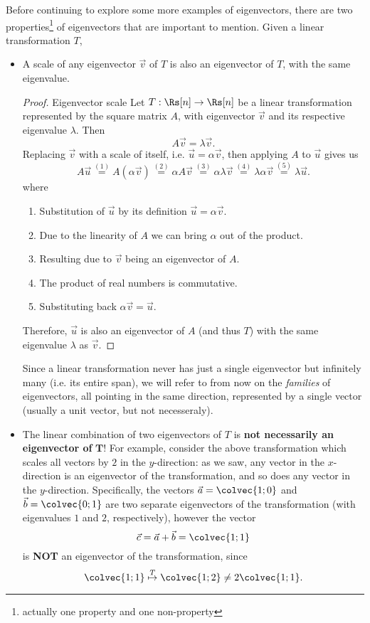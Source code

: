 Before continuing to explore some more examples of eigenvectors, there are two properties\footnote{actually one property and one non-property} of eigenvectors that are important to mention. Given a linear transformation $T$,
\begin{itemize}
	\item A scale of any eigenvector $\vec{v}$ of $T$ is also an eigenvector of $T$, with the same eigenvalue.
		\begin{proof}{Eigenvector scale}{}
			Let $T:\Rs[n]\to\Rs[n]$ be a linear transformation represented by the square matrix $A$, with eigenvector $\vec{v}$ and its respective eigenvalue $\lambda$. Then
			\[
				A\vec{v} = \lambda\vec{v}.
			\]
			Replacing $\vec{v}$ with a scale of itself, i.e. $\vec{u}=\alpha\vec{v}$, then applying $A$ to $\vec{u}$ gives us
			\[
				A\vec{u} \overset{(1)}{=} A \left( \alpha\vec{v} \right) \overset{(2)}{=} \alpha A \vec{v} \overset{(3)}{=} \alpha\lambda\vec{v} \overset{(4)}{=} \lambda\alpha\vec{v} \overset{(5)}{=} \lambda\vec{u}.
			\]
			where
			\begin{enumerate}[label=(\arabic*)]
				\item Substitution of $\vec{u}$ by its definition $\vec{u}=\alpha\vec{v}$.
				\item Due to the linearity of $A$ we can bring $\alpha$ out of the product.
				\item Resulting due to $\vec{v}$ being an eigenvector of $A$.
				\item The product of real numbers is commutative.
				\item Substituting back $\alpha\vec{v}=\vec{u}$.
			\end{enumerate}

			Therefore, $\vec{u}$ is also an eigenvector of $A$ (and thus $T$) with the same eigenvalue $\lambda$ as $\vec{v}$.
		\end{proof}

		Since a linear transformation never has just a single eigenvector but infinitely many (i.e. its entire span), we will refer to from now on the \emph{families} of eigenvectors, all pointing in the same direction, represented by a single vector (usually a unit vector, but not necesseraly).

	\item The linear combination of two eigenvectors of $T$ is \textbf{not necessarily an eigenvector of} $\bm{T}$! For example, consider the above transformation which scales all vectors by $2$ in the $y$-direction: as we saw, any vector in the $x$-direction is an eigenvector of the transformation, and so does any vector in the $y$-direction. Specifically, the vectors $\vec{a}=\colvec{1;0}$ and $\vec{b}=\colvec{0;1}$ are two separate eigenvectors of the transformation (with eigenvalues $1$ and $2$, respectively), however the vector
		\[
			\vec{c} = \vec{a}+\vec{b} = \colvec{1;1}
		\]
		is \textbf{NOT} an eigenvector of the transformation, since
		\[
			\colvec{1;1} \overset{T}{\mapsto} \colvec{1;2} \neq 2\colvec{1;1}.
		\]
\end{itemize}


